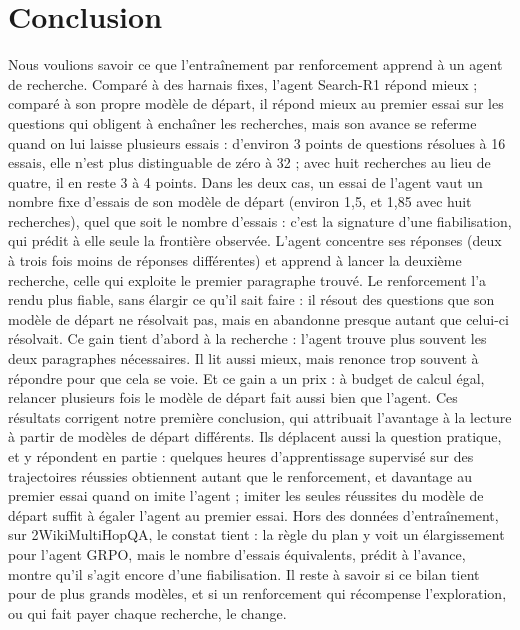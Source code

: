 \chapter{Conclusion}\label{ch:conclusion}
Nous voulions savoir ce que l'entraînement par renforcement apprend à un agent de recherche. Comparé à des harnais fixes, l'agent Search-R1 répond mieux ; comparé à son propre modèle de départ, il répond mieux au premier essai sur les questions qui obligent à enchaîner les recherches, mais son avance se referme quand on lui laisse plusieurs essais : d'environ 3 points de questions résolues à 16 essais, elle n'est plus distinguable de zéro à 32  ; avec huit recherches au lieu de quatre, il en reste 3 à 4 points. Dans les deux cas, un essai de l'agent vaut un nombre fixe d'essais de son modèle de départ (environ 1,5, et 1,85 avec huit recherches), quel que soit le nombre d'essais : c'est la signature d'une fiabilisation, qui prédit à elle seule la frontière observée. L'agent concentre ses réponses (deux à trois fois moins de réponses différentes) et apprend à lancer la deuxième recherche, celle qui exploite le premier paragraphe trouvé. Le renforcement l'a rendu plus fiable, sans élargir ce qu'il sait faire : il résout des questions que son modèle de départ ne résolvait pas, mais en abandonne presque autant que celui-ci résolvait. Ce gain tient d'abord à la recherche : l'agent trouve plus souvent les deux paragraphes nécessaires. Il lit aussi mieux, mais renonce trop souvent à répondre pour que cela se voie. Et ce gain a un prix : à budget de calcul égal, relancer plusieurs fois le modèle de départ fait aussi bien que l'agent. Ces résultats corrigent notre première conclusion, qui attribuait l'avantage à la lecture à partir de modèles de départ différents. Ils déplacent aussi la question pratique, et y répondent en partie : quelques heures d'apprentissage supervisé sur des trajectoires réussies obtiennent autant que le renforcement, et davantage au premier essai quand on imite l'agent ; imiter les seules réussites du modèle de départ suffit à égaler l'agent au premier essai. Hors des données d'entraînement, sur 2WikiMultiHopQA, le constat tient : la règle du plan y voit un élargissement pour l'agent GRPO, mais le nombre d'essais équivalents, prédit à l'avance, montre qu'il s'agit encore d'une fiabilisation. Il reste à savoir si ce bilan tient pour de plus grands modèles, et si un renforcement qui récompense l'exploration, ou qui fait payer chaque recherche, le change.
